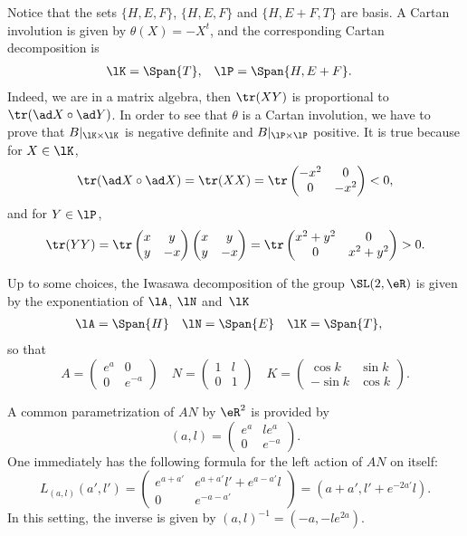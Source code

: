 Notice that the sets $\{ H,E,F \}$, $\{ H,E,F \}$ and $\{ H,E+F,T \}$ are basis. A Cartan involution is given by $\theta(X)=-X^t$, and the corresponding Cartan decomposition is
\begin{align}
   \lK&=\Span\{ T \},
&\lP&=\Span\{ H,E+F \}.
\end{align}
Indeed, we are in a matrix algebra, then $\tr(XY)$ is proportional to $\tr(\ad X\circ \ad Y)$.
 In order to see that $\theta$ is a Cartan involution, we have to prove that $B|_{\lK\times\lK}$ is negative definite and $B|_{\lP\times\lP}$ positive. It is true because for $X\in\lK$,
\[
    \tr(\ad X\circ \ad X)=\tr(XX)=\tr\begin{pmatrix}
-x^2 & 0 \\
0 & -x^2
\end{pmatrix}<0,
\]
and for $Y\in\lP$,
\[
    \tr(YY)=\tr\begin{pmatrix}
x & y \\
y & -x
\end{pmatrix}\begin{pmatrix}
x & y \\
y & -x
\end{pmatrix} =\tr\begin{pmatrix}
x^2+y^2 & 0 \\
0 & x^2+y^2
\end{pmatrix} >0.
\]

Up to some choices, the Iwasawa decomposition\label{pg_iwasldr} of the group $\SL(2,\eR)$ is given by the exponentiation of $\lA$, $\lN$ and~$\lK$
\begin{equation}
\begin{aligned}
  \lA&=\Span\{ H \}
&\lN&=\Span\{ E \}
&\lK&=\Span\{T\},
\end{aligned}
\end{equation}
so that
\begin{equation}\label{eq:expo_ANK}
A=\begin{pmatrix}
e^a & 0 \\
0 & e^{-a}
\end{pmatrix}\quad
N=\begin{pmatrix}
1 & l \\
0 & 1
\end{pmatrix}\quad
K=\begin{pmatrix}
\cos k & \sin k \\
-\sin k & \cos k
\end{pmatrix}.
\end{equation}

A common parametrization of $AN$ by $\eR^2$ is provided by
\begin{equation}   \label{EqParmalSL} 
(a,l)=
\begin{pmatrix}
  e^a&le^a\\
  0  &e^{-a}
\end{pmatrix}.
\end{equation}
One immediately has the following formula for the left action of $AN$ on itself:
\[
  L_{(a,l)}(a',l')=\begin{pmatrix}
e^{a+a'} & e^{a+a'}l'+e^{a-a'}l \\
0 & e^{-a-a'}
\end{pmatrix}=(a+a',l'+e^{-2a'}l).
\]
In this setting, the inverse is given by $(a,l)^{-1}=(-a,-l e^{2a})$.  

